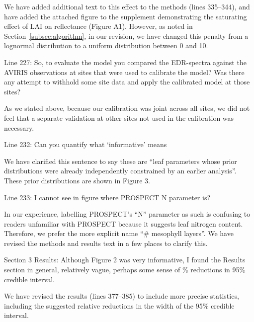 We have added additional text to this effect to the methods (lines 335--344), and have added the attached figure to the supplement demonstrating the saturating effect of LAI on reflectance (Figure A1).
However, as noted in Section~\ref{subsec:algorithm}, in our revision, we have changed this penalty from a lognormal distribution to a uniform distribution between 0 and 10.

\begin{reviewer}
  Line 227: So, to evaluate the model you compared the EDR-spectra against the AVIRIS observations at sites that were used to calibrate the model? Was there any attempt to withhold some site data and apply the calibrated model at those sites?
\end{reviewer}

As we stated above, because our calibration was joint across all sites, we did not feel that a separate validation at other sites not used in the calibration was necessary.

\begin{reviewer}
  Line 232: Can you quantify what ‘informative’ means
\end{reviewer}

We have clarified this sentence to say these are ``leaf parameters whose prior distributions were already independently constrained by an earlier analysis''. These prior distributions are shown in Figure 3.

\begin{reviewer}
  Line 233: I cannot see in figure where PROSPECT N parameter is?
\end{reviewer}

In our experience, labelling PROSPECT’s ``N'' parameter as such is confusing to readers unfamiliar with PROSPECT because it suggests leaf nitrogen content.
Therefore, we prefer the more explicit name ``\# mesophyll layers''.
We have revised the methods and results text in a few places to clarify this.

\begin{reviewer}
  Section 3 Results: Although Figure 2 was very informative, I found the Results section in general, relatively vague, perhaps some sense of \% reductions in 95\% credible interval.
\end{reviewer}

We have revised the results (lines 377--385) to include more precise statistics, including the suggested relative reductions in the width of the 95\% credible interval.

